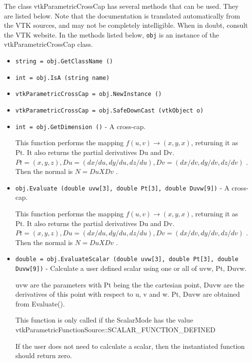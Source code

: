 The class vtkParametricCrossCap has several methods that can be used.
  They are listed below.
Note that the documentation is translated automatically from the VTK sources,
and may not be completely intelligible.  When in doubt, consult the VTK website.
In the methods listed below, \verb|obj| is an instance of the vtkParametricCrossCap class.
\begin{itemize}
\item  \verb|string = obj.GetClassName ()|

\item  \verb|int = obj.IsA (string name)|

\item  \verb|vtkParametricCrossCap = obj.NewInstance ()|

\item  \verb|vtkParametricCrossCap = obj.SafeDownCast (vtkObject o)|

\item  \verb|int = obj.GetDimension ()| -  A cross-cap.

 This function performs the mapping $f(u,v) \rightarrow (x,y,x)$, returning it
 as Pt. It also returns the partial derivatives Du and Dv.
 $Pt = (x, y, z), Du = (dx/du, dy/du, dz/du), Dv = (dx/dv, dy/dv, dz/dv)$ .
 Then the normal is $N = Du X Dv$ .

\item  \verb|obj.Evaluate (double uvw[3], double Pt[3], double Duvw[9])| -  A cross-cap.

 This function performs the mapping $f(u,v) \rightarrow (x,y,x)$, returning it
 as Pt. It also returns the partial derivatives Du and Dv.
 $Pt = (x, y, z), Du = (dx/du, dy/du, dz/du), Dv = (dx/dv, dy/dv, dz/dv)$ .
 Then the normal is $N = Du X Dv$ .

\item  \verb|double = obj.EvaluateScalar (double uvw[3], double Pt[3], double Duvw[9])| -  Calculate a user defined scalar using one or all of uvw, Pt, Duvw.

 uvw are the parameters with Pt being the the cartesian point, 
 Duvw are the derivatives of this point with respect to u, v and w.
 Pt, Duvw are obtained from Evaluate().

 This function is only called if the ScalarMode has the value
 vtkParametricFunctionSource::SCALAR\_FUNCTION\_DEFINED

 If the user does not need to calculate a scalar, then the 
 instantiated function should return zero. 


\end{itemize}
